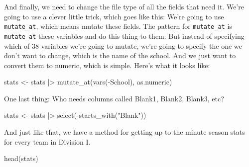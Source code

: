 \documentclass[
  letterpaper,
  DIV=11,
  numbers=noendperiod]{scrreprt}
\newenvironment{Shaded}{\begin{snugshade}}{\end{snugshade}}
\newcommand{\FunctionTok}[1]{\textcolor[rgb]{0.28,0.35,0.67}{#1}}
\newcommand{\NormalTok}[1]{\textcolor[rgb]{0.00,0.23,0.31}{#1}}
\newcommand{\OtherTok}[1]{\textcolor[rgb]{0.00,0.23,0.31}{#1}}
\newcommand{\SpecialCharTok}[1]{\textcolor[rgb]{0.37,0.37,0.37}{#1}}
\newcommand{\StringTok}[1]{\textcolor[rgb]{0.13,0.47,0.30}{#1}}
\begin{document}
And finally, we need to change the file type of all the fields that need
it. We're going to use a clever little trick, which goes like this:
We're going to use \texttt{mutate\_at}, which means mutate these fields.
The pattern for \texttt{mutate\_at} is \texttt{mutate\_at} these
variables and do this thing to them. But instead of specifying which of
38 variables we're going to mutate, we're going to specify the one we
don't want to change, which is the name of the school. And we just want
to convert them to numeric, which is simple. Here's what it looks like:

\begin{Shaded}
\begin{Highlighting}[]
\NormalTok{stats }\OtherTok{\textless{}{-}}\NormalTok{ stats }\SpecialCharTok{|\textgreater{}} \FunctionTok{mutate\_at}\NormalTok{(}\FunctionTok{vars}\NormalTok{(}\SpecialCharTok{{-}}\NormalTok{School), as.numeric)}
\end{Highlighting}
\end{Shaded}

One last thing: Who needs columns called Blank1, Blank2, Blank3, etc?

\begin{Shaded}
\begin{Highlighting}[]
\NormalTok{stats }\OtherTok{\textless{}{-}}\NormalTok{ stats }\SpecialCharTok{|\textgreater{}} \FunctionTok{select}\NormalTok{(}\SpecialCharTok{{-}}\FunctionTok{starts\_with}\NormalTok{(}\StringTok{"Blank"}\NormalTok{))}
\end{Highlighting}
\end{Shaded}

And just like that, we have a method for getting up to the minute season
stats for every team in Division I.

\begin{Shaded}
\begin{Highlighting}[]
\FunctionTok{head}\NormalTok{(stats)}
\end{Highlighting}
\end{Shaded}
\end{document}
